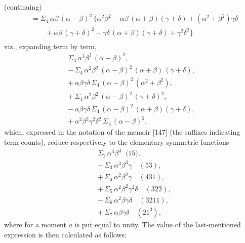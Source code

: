 \documentclass[11pt]{article}
\begin{document}
\noindent (continuing)
\[
\begin{aligned}
   & = \Sigma_4\,\alpha\beta\,(\alpha - \beta)^2\,\bigl\{\alpha^2\beta^2 - \alpha\beta\,(\alpha + \beta)(\gamma + \delta) + (\alpha^2 + \beta^2)\gamma\delta\\
   & \qquad + \alpha\beta\,(\gamma + \delta)^2 - \gamma\delta\,(\alpha + \beta)(\gamma + \delta) + \gamma^2\delta^2\bigr\}\\
\end{aligned}
\]
viz., expanding term by term,
\[
\begin{array}{l}
   \Sigma_4\,\alpha^3\beta^3\,(\alpha - \beta)^2,\\[2pt]
   -\,\Sigma_4\,\alpha^2\beta^2\,(\alpha - \beta)^2\,(\alpha + \beta)\,(\gamma + \delta),\\[2pt]
   +\,\alpha\beta\gamma\delta\,\Sigma_4\,(\alpha - \beta)^2\,(\alpha^2 + \beta^2),\\[2pt]
   +\,\Sigma_4\,\alpha^2\beta^2\,(\alpha - \beta)^2\,(\gamma + \delta)^2,\\[2pt]
   -\,\alpha\beta\gamma\delta\,\Sigma_4\,(\alpha - \beta)^2\,(\alpha + \beta)(\gamma + \delta),\\[2pt]
   +\,\alpha^2\beta^2\gamma^2\delta^2\,\Sigma_4\,(\alpha - \beta)^2,
\end{array}
\]
which, expressed in the notation of the memoir [147] (the suffixes indicating term-counts), reduce respectively to the elementary symmetric functions
\[
\begin{aligned}
   & \Sigma_2\,\alpha^4\beta^4 \;\;\text{(15)},\\
   & -\,\Sigma_3\,\alpha^3\beta^3\gamma\quad (53),\\
   & +\,\Sigma_4\,\alpha^2\beta^2\gamma\quad (431),\\
   & +\,\Sigma_5\,\alpha^2\beta^2\gamma^2\delta\quad (322),\\
   & -\,\Sigma_6\,\alpha^2\beta\gamma\delta\quad (3211),\\
   & +\,\Sigma_7\,\alpha\beta\gamma\delta\quad (21^3),
\end{aligned}
\]
where for a moment $a$ is put equal to unity. The value of the last-mentioned expression is then calculated as follows:
\medskip

\end{document}
